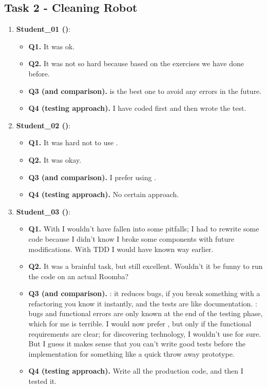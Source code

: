 \subsection{Task 2 - Cleaning Robot}
\begin{enumerate}
    \item \textbf{Student\_01 (\notdd)}:
    \begin{itemize}
        \item \textbf{Q1.} It was ok.
        \item \textbf{Q2.} It was not so hard because based on the exercises we have done before. 
        \item \textbf{Q3 (\tdd and \notdd comparison).} \tdd is the best one to avoid any errors in the future.
        \item \textbf{Q4 (\notdd testing approach).} I have coded first and then wrote the test.  
    \end{itemize}

    \item \textbf{Student\_02 (\notdd)}:
    \begin{itemize}
        \item \textbf{Q1.} It was hard not to use \tdd.
        \item \textbf{Q2.} It was okay.
        \item \textbf{Q3 (\tdd and \notdd comparison).} I prefer using \tdd.
        \item \textbf{Q4 (\notdd testing approach).} No certain approach.  
    \end{itemize}

    \item \textbf{Student\_03 (\notdd)}:
    \begin{itemize}
        \item \textbf{Q1.} With \tdd I wouldn't have fallen into some pitfalls; I had to rewrite some code because I didn't know I broke some components with future modifications. With TDD I would have known way earlier. 
        \item \textbf{Q2.} It was a brainful task, but still excellent. Wouldn't it be funny to run the code on an actual Roomba?
        \item \textbf{Q3 (\tdd and \notdd comparison).} \tdd: it reduces bugs, if you break something with a refactoring you know it instantly, and the tests are like documentation. \notdd: bugs and functional errors are only known at the end of the testing phase, which for me is terrible. I would now prefer \tdd, but only if the functional requirements are clear; for discovering technology, I wouldn't use \tdd for sure. But I guess it makes sense that you can't write good tests before the implementation for something like a quick throw away prototype.
        \item \textbf{Q4 (\notdd testing approach).} Write all the production code, and then I tested it.
    \end{itemize}


\end{enumerate}
